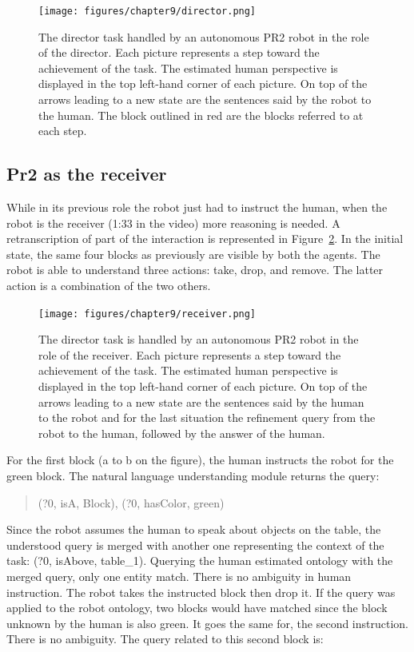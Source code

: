 \begin{figure}[ht!]
\centering
\texttt{[image: figures/chapter9/director.png]}
\caption{\label{fig:chap9_director} The director task handled by an autonomous PR2 robot in the role of the director. Each picture represents a step toward the achievement of the task. The estimated human perspective is displayed in the top left-hand corner of each picture. On top of the arrows leading to a new state are the sentences said by the robot to the human. The block outlined in red are the blocks referred to at each step. }
\end{figure}

\subsection{Pr2 as the receiver}

While in its previous role the robot just had to instruct the human, when the robot is the receiver (1:33 in the video) more reasoning is needed. A retranscription of part of the interaction is represented in Figure~\ref{fig:chap9_receiver}. In the initial state, the same four blocks as previously are visible by both the agents. The robot is able to understand three actions: take, drop, and remove. The latter action is a combination of the two others.

\begin{figure}[ht!]
\centering
\texttt{[image: figures/chapter9/receiver.png]}
\caption{\label{fig:chap9_receiver} The director task is handled by an autonomous PR2 robot in the role of the receiver. Each picture represents a step toward the achievement of the task. The estimated human perspective is displayed in the top left-hand corner of each picture. On top of the arrows leading to a new state are the sentences said by the human to the robot and for the last situation the refinement query from the robot to the human, followed by the answer of the human. }
\end{figure}

For the first block (a to b on the figure), the human instructs the robot for the green block. The natural language understanding module returns the \sparql{} query:

\begin{quote} 
\centering 
(?0, isA, Block), (?0, hasColor, green)
\end{quote}

Since the robot assumes the human to speak about objects on the table, the understood query is merged with another one representing the context of the task: (?0, isAbove, table\_1). Querying the human estimated ontology with the merged query, only one entity match. There is no ambiguity in human instruction. The robot takes the instructed block then drop it. If the query was applied to the robot ontology, two blocks would have matched since the block unknown by the human is also green. It goes the same for, the second instruction. There is no ambiguity. The \sparql{} query related to this second block is:

